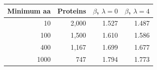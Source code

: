 \begin{tabular}{rrrr}
\toprule
Minimum aa & Proteins & $\beta$, $\lambda=0$ & $\beta$, $\lambda=4$ \\
\midrule
10 & 2,000 & 1.527 & 1.487 \\
100 & 1,500 & 1.610 & 1.586 \\
400 & 1,167 & 1.699 & 1.677 \\
1000 & 747 & 1.794 & 1.773 \\
\bottomrule
\end{tabular}
